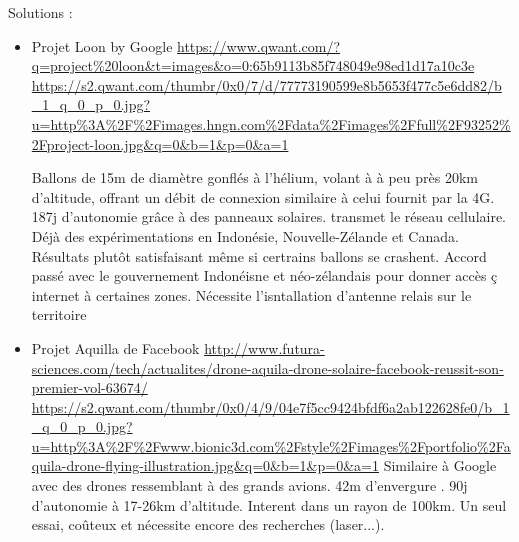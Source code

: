 \documentclass{article}
\begin{document}
Solutions : 
\begin{itemize}
    \item Projet Loon by Google
    \url{https://www.qwant.com/?q=project%20loon&t=images&o=0:65b9113b85f748049e98ed1d17a10c3e}
    \url{https://s2.qwant.com/thumbr/0x0/7/d/77773190599e8b5653f477c5e6dd82/b_1_q_0_p_0.jpg?u=http%3A%2F%2Fimages.hngn.com%2Fdata%2Fimages%2Ffull%2F93252%2Fproject-loon.jpg&q=0&b=1&p=0&a=1}
    
    Ballons de 15m de diamètre gonflés à l'hélium, volant à à peu près 20km d'altitude, offrant un débit de connexion similaire à celui fournit par la 4G. 187j d'autonomie grâce à des panneaux solaires. transmet le réseau cellulaire.
    Déjà des expérimentations en Indonésie, Nouvelle-Zélande et Canada. Résultats plutôt satisfaisant même si certrains ballons se crashent. Accord passé avec le gouvernement Indonéisne et néo-zélandais pour donner accès ç internet à certaines zones. Nécessite l'isntallation d'antenne relais sur le territoire
    
    \item Projet Aquilla de Facebook
    \url{http://www.futura-sciences.com/tech/actualites/drone-aquila-drone-solaire-facebook-reussit-son-premier-vol-63674/} 
    \url{https://s2.qwant.com/thumbr/0x0/4/9/04e7f5cc9424bfdf6a2ab122628fe0/b_1_q_0_p_0.jpg?u=http%3A%2F%2Fwww.bionic3d.com%2Fstyle%2Fimages%2Fportfolio%2Faquila-drone-flying-illustration.jpg&q=0&b=1&p=0&a=1}
    Similaire à Google avec des drones ressemblant à des grands avions.  42m d'envergure . 90j d'autonomie à 17-26km d'altitude. Interent dans un rayon de 100km.
    Un seul essai, coûteux et nécessite encore des recherches (laser...).
    
\end{itemize}
\end{document}
